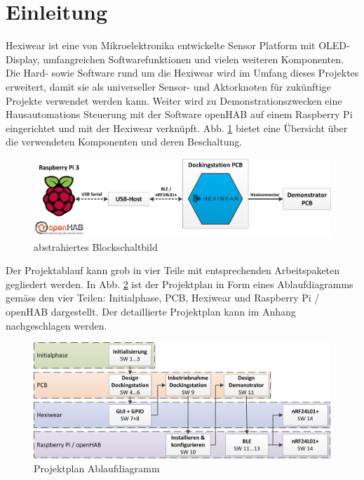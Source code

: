 \newpage
\section{Einleitung}
Hexiwear ist eine von Mikroelektronika entwickelte Sensor Platform mit OLED-Display, umfangreichen Softwarefunktionen und vielen weiteren Komponenten. Die Hard- sowie Software rund um die Hexiwear wird im Umfang dieses Projektes erweitert, damit sie als universeller Sensor- und Aktorknoten für zukünftige Projekte verwendet werden kann. Weiter wird zu Demonstrationszwecken eine Hausautomations Steuerung mit der Software openHAB auf einem Raspberry Pi eingerichtet und mit der Hexiwear verknüpft. Abb. \ref{fig:komp_abstrakt} bietet eine Übersicht über die verwendeten Komponenten und deren Beschaltung.

\begin{figure}[H]
	\includegraphics[width=1\textwidth]{Illustrationen/1-Einleitung/Komponentenuebersicht_grob.png}
	\caption{abstrahiertes Blockschaltbild}
	\label{fig:komp_abstrakt}
\end{figure}

Der Projektablauf kann grob in vier Teile mit entsprechenden Arbeitspaketen gegliedert werden. In Abb. \ref{fig:projektplan} ist der Projektplan in Form eines Ablaufdiagramms gemäss den vier Teilen: Initialphase, PCB, Hexiwear und Raspberry Pi / openHAB dargestellt. Der detaillierte Projektplan kann im Anhang nachgeschlagen werden.

\begin{figure}[H]
	\includegraphics[width=1\textwidth]{Illustrationen/1-Einleitung/Zeitplan.png}
	\caption{Projektplan Ablaufdiagramm}
	\label{fig:projektplan}
\end{figure}

